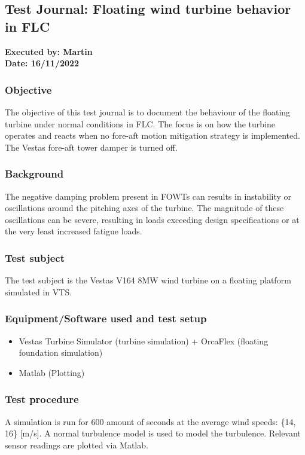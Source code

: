 \subsection{Test Journal: Floating wind turbine behavior in FLC} \label{app:tj_02}

\textbf{Executed by: Martin} \\
\textbf{Date: 16/11/2022}

\subsubsection{Objective}
The objective of this test journal is to document the behaviour of the floating turbine under normal conditions in FLC. The focus is on how the turbine operates and reacts when no fore-aft motion mitigation strategy is implemented. The Vestas fore-aft tower damper is turned off.

\subsubsection{Background}
The negative damping problem present in FOWTs can results in instability or oscillations around the pitching axes of the turbine. The magnitude of these oscillations can be severe, resulting in loads exceeding design specifications or at the very least increased fatigue loads.

\subsubsection{Test subject}
The test subject is the Vestas V164 8MW wind turbine on a floating platform simulated in VTS.

\subsubsection{Equipment/Software used and test setup}
\begin{itemize}
	\item Vestas Turbine Simulator (turbine simulation) + OrcaFlex (floating foundation simulation)
	\item Matlab (Plotting)
\end{itemize}

\subsubsection{Test procedure}
A simulation is run for 600 amount of seconds at the average wind speeds: \{14, 16\} [m/s]. A normal turbulence model is used to model the turbulence. Relevant sensor readings are plotted via Matlab.


